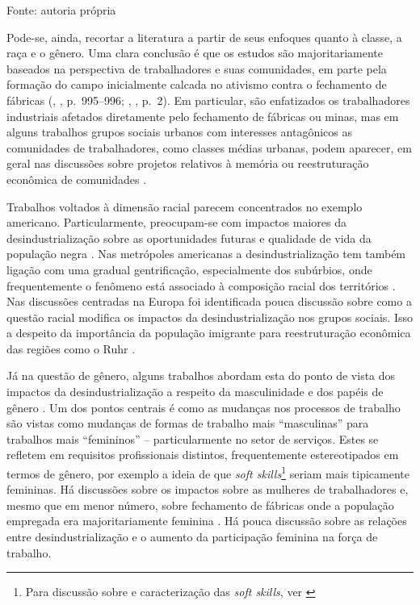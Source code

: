 \begin{table}[htbp]
\centering
\caption{Resumo dos casos de desindustrialização na literatura}
\label{tab:cap02-resumo-casos}
\end{table}

Fonte: autoria própria

Pode-se, ainda, recortar a literatura a partir de seus enfoques quanto à
classe, a raça e o gênero. Uma clara conclusão é que os estudos são
majoritariamente baseados na perspectiva de trabalhadores e suas
comunidades, em parte pela formação do campo inicialmente calcada no
ativismo contra o fechamento de fábricas
(\citeauthor{high_wounds_2013}, \citeyear{high_wounds_2013}, p.~995--996; \citeauthor{lawson_making_2020}, \citeyear{lawson_making_2020}, p.~2). Em particular, são enfatizados os
trabalhadores industriais afetados diretamente pelo fechamento de
fábricas ou minas, mas em alguns trabalhos grupos sociais urbanos com
interesses antagônicos as comunidades de trabalhadores, como classes
médias urbanas, podem aparecer, em geral nas discussões sobre projetos
relativos à memória ou reestruturação econômica de comunidades
\citep{hodson_titanic_2019,hoekstra_iconic_2020,lewis_regenerating_2016}.

Trabalhos voltados à dimensão racial parecem concentrados no exemplo
americano. Particularmente, preocupam-se com impactos maiores da
desindustrialização sobre as oportunidades futuras e qualidade de vida
da população negra
\citep{berger_industrial_2022}. Nas metrópoles americanas a desindustrialização tem também
ligação com uma gradual gentrificação, especialmente dos subúrbios, onde
frequentemente o fenômeno está associado à composição racial dos
territórios
\citep{highsmith_beyond_2014,winant_hard_2019}. Nas discussões centradas na Europa foi identificada
pouca discussão sobre como a questão racial modifica os impactos da
desindustrialização nos grupos sociais. Isso a despeito da importância
da população imigrante para reestruturação econômica das regiões como o
Ruhr \citep{berger_burdens_2017}.

Já na questão de gênero, alguns trabalhos abordam esta do ponto de vista
dos impactos da desindustrialização a respeito da masculinidade e dos
papéis de gênero
\citep{nayak_displaced_2006}. Um dos
pontos centrais é como as mudanças nos processos de trabalho são vistas
como mudanças de formas de trabalho mais ``masculinas'' para trabalhos
mais ``femininos'' -- particularmente no setor de serviços. Estes se
refletem em requisitos profissionais distintos, frequentemente
estereotipados em termos de gênero, por exemplo a ideia de que
\emph{soft skills}\footnote{Para discussão sobre e caracterização das
  \emph{soft skills}, ver \citet[p.~99--103]{thompson_working_2010}}
seriam mais tipicamente femininas. Há discussões sobre os impactos sobre
as mulheres de trabalhadores e, mesmo que em menor número, sobre
fechamento de fábricas onde a população empregada era majoritariamente
feminina \citep{clarke_closing_2011}. Há pouca discussão sobre as relações entre desindustrialização e
o aumento da participação feminina na força de trabalho.

